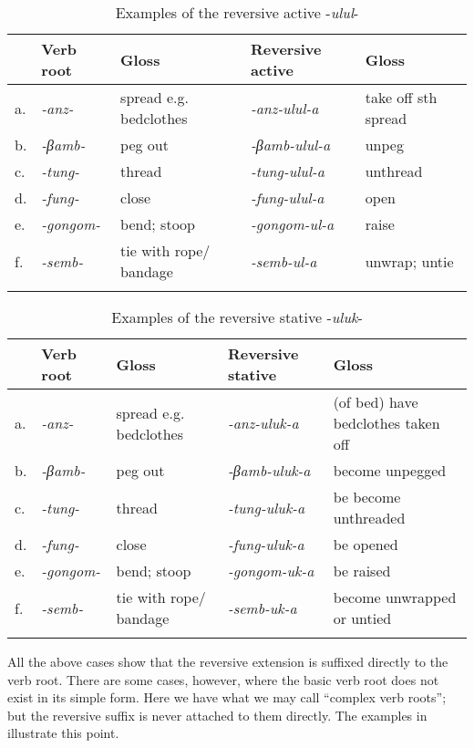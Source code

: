 \documentclass[output=paper		  ]{langscibook}
\begin{document}
\begin{table}
\begin{tabularx}{\textwidth}{llQlQ}
\lsptoprule
& {{{{Verb} {root}}}} & {Gloss} & {{{{Reversive} {active}}}} & {{{{Gloss}}}}\\
\midrule
 {a.}& { \textit{-anz-}} & spread e.g. bedclothes & {\itshape {}-anz-ulul-a} & take off sth spread\\
 {b.}& { \textit{-βamb-}} & peg out & {\itshape {}-βamb-ulul-a} & unpeg\\
 {c.}& { \textit{-tung-}} & thread & {\itshape {}-tung-ulul-a} & unthread\\
 {d.}& { \textit{-fung-}} & close & {\itshape {}-fung-ulul-a} & open\\
 {e.}& { \textit{-gongom-}} & bend; stoop & {\itshape {}-gongom-ul-a} & raise\\
 {f.}& { \textit{-semb-}} & tie with rope/ bandage & {\itshape {}-semb-ul-a} & unwrap; untie\\
\lspbottomrule
\end{tabularx}
\caption{Examples of the reversive active -\textit{ulul}-}
\label{tabex:kahigi:19}
\end{table}

\begin{table}
\begin{tabularx}{\textwidth}{llQlQ}
\lsptoprule
 & {{{{Verb} {root}}}} & {Gloss} & {{{{Reversive} {stative}}}} & {{{{Gloss}}}}\\
 \midrule
 {a.}& {\textit{-anz-}} & spread e.g. bedclothes & {\itshape {}-anz-uluk-a} & (of bed) have bedclothes taken off\\
 {b.}& {\textit{-βamb-}} & peg out & { {\textit{{}-βamb-uluk-a}}} & become unpegged\\
 {c.}& {\textit{-tung-}} & { {thread}} & {\itshape {}-tung-uluk-a} & be become unthreaded\\
 {d.}& {\textit{-fung-}} & { {close}} & {\itshape {}-fung-uluk-a} & be opened\\
 {e.}& {\textit{-gongom-}} & bend; stoop & {\itshape {}-gongom-uk-a} & be raised\\
 {f.}& {\textit{-semb-}} & tie with rope/ bandage & {\itshape {}-semb-uk-a} & become unwrapped or untied\\
\lspbottomrule
\end{tabularx}
\caption{Examples of the reversive stative -\textit{uluk}-}
\label{tabex:kahigi:20}
\end{table}

{All the above cases show that the reversive extension is suffixed directly to the verb root. There are some cases, however, where the basic verb root does not exist in its simple form. Here we have what we may call ``complex verb roots''; but the reversive suffix is never attached to them directly. The  examples in  illustrate this point.} 
\end{document}
